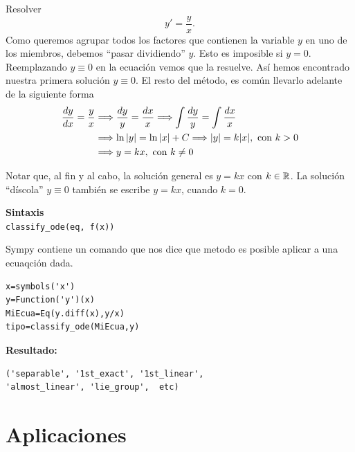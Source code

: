 \begin{ejemplo} Resolver
\[y'=\frac{y}{x}.\]
Como queremos agrupar todos los factores que contienen la variable $y$ en uno de los miembros, debemos ``pasar dividiendo'' $y$. Esto es imposible si $y=0$. Reemplazando $y\equiv 0$ en la ecuación vemos que la resuelve. Así hemos encontrado nuestra primera solución $y\equiv 0$. El resto del método, es común llevarlo adelante de la siguiente forma
\[\begin{split}
   \frac{dy}{dx}=\frac{y}{x} &\Longrightarrow \frac{dy}{y}=\frac{dx}{x} \Longrightarrow \int \frac{dy}{y}=\int \frac{dx}{x}\\
   &\Longrightarrow\ln|y|=\ln|x|+C \Longrightarrow |y|= k|x|, \hbox{ con }k>0\\
   &\Longrightarrow y= kx, \hbox{ con }k\neq 0
  \end{split}
\]
\end{ejemplo}
Notar que, al fin y al cabo, la solución general es $y=kx$ con $k\in\rr$. La solución ``díscola'' $y\equiv 0$ también se escribe $y=kx$, cuando $k=0$.



\begin{codigo}
\textbf{Sintaxis}\\
\texttt{classify\_ode(eq, f(x))}\\

\end{codigo}
\begin{ejemplo}

\end{ejemplo}

Sympy contiene un comando que nos dice que metodo es posible aplicar a una ecuaqción dada.
\begin{lstlisting}
x=symbols('x')
y=Function('y')(x)
MiEcua=Eq(y.diff(x),y/x)
tipo=classify_ode(MiEcua,y)
\end{lstlisting}

\textbf{Resultado:}\\
\begin{verbatim}
('separable', '1st_exact', '1st_linear', 
'almost_linear', 'lie_group',  etc)
\end{verbatim}


\section{Aplicaciones}

